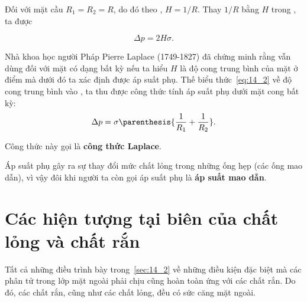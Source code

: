 Đối với mặt cầu $R_1=R_2=R$, do đó theo , $H=1/R$. Thay $1/R$ bằng $H$ trong , ta được

\begin{equation}\label{eq:14_3}
	\Delta p = 2H\sigma.
\end{equation}

Nhà khoa học người Pháp Pierre Laplace (1749-1827) đã chứng minh rằng  vẫn dùng đối với mặt có dạng bất kỳ nếu ta hiểu $H$ là độ cong trung bình của mặt ở điểm mà dưới đó ta xác định được áp suất phụ. Thế biểu thức~\eqref{eq:14_2} về độ cong trung bình vào , ta thu được công thức tính áp suất phụ dưới mặt cong bất kỳ:
\begin{equation}\label{eq:14_4}
	\Delta p = \sigma\parenthesis{\frac{1}{R_1} + \frac{1}{R_2}}.
\end{equation}

\noindent

Công thức này gọi là \textbf{công thức Laplace}.


Áp suất phụ  gây ra sự thay đổi mức chất lỏng trong những ống hẹp (các ống mao dẫn), vì vậy đôi khi người ta còn gọi áp suất phụ là \textbf{áp suất mao dẫn}.


\section{Các hiện tượng tại biên của chất lỏng và chất rắn}\label{sec:14_4}

Tất cả những điều trình bày trong~\ref{sec:14_2} về những điều kiện đặc biệt mà các phân tử trong lớp mặt ngoài phải chịu cũng hoàn toàn ứng với các chất rắn. Do đó, các chất rắn, cũng như các chất lỏng, đều có sức căng mặt ngoài.

